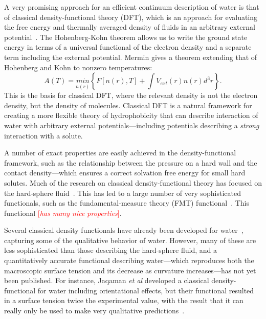 \documentclass[letterpaper,twocolumn,amsmath,amssymb,prb]{revtex4-1}
\newcommand{\needsworknow}[1]{\textcolor{red}{[\emph{#1}]}}
\begin{document}
A very promising approach for an efficient continuum description of water
is that of classical density-functional theory (DFT), which is an approach
for evaluating the free energy and thermally averaged density of fluids in
an arbitrary external potential~\cite{ebner1976density}. The Hohenberg-Kohn
theorem\cite{hohenberg1964inhomogeneous} allows us to write the ground state
energy in terms of a universal functional of the electron density and a separate
term including the external potential. Mermin\cite{mermin1965thermal} gives a
theorem extending that of Hohenberg and Kohn to nonzero temperatures:
\begin{equation}
  A(T) = \underset{n(r)}{min}\left\{ F[n(r),T] + \int V_{ext}(r) n(r)
d^3r\right\}.
\end{equation}
This is the basis for classical DFT, where the relevant density is not the
electron density, but the density of molecules. Classical DFT is a
natural framework for creating a more flexible theory of hydrophobicity
that can describe interaction of water with arbitrary external
potentials---including potentials describing a \emph{strong} interaction
with a solute.
 
A number of exact properties are easily achieved in the density-functional
framework, such as the relationship between the pressure on a hard wall and
the contact density---which ensures a correct solvation free energy for
small hard solutes.  Much of the research on classical density-functional
theory has focused on the hard-sphere fluid~\cite{curtin1985,
rosenfeld1989, rosenfeld1993, rosenfeld1997, tarazona1997, tarazona2000}.
This has led to a large number of very sophisticated functionals, such as
the fundamental-measure theory (FMT) functional~\cite{rosenfeld1989,
rosenfeld1993, rosenfeld1997, tarazona1997, tarazona2000}.  This functional
\needsworknow{has many nice properties}.

Several classical density functionals have already been developed for
water~\cite{ding1987, Yang1992, Jaqaman2004}, capturing some of the
qualitative behavior of water.  However, many of these are less
sophisticated than those describing the hard-sphere fluid, and a
quantitatively accurate functional describing water---which reproduces both
the macroscopic surface tension and its decrease as curvature
increases---has not yet been published.  For instance, Jaqaman \emph{et al}
developed a classical density-functional for water including orientational
effects, but their functional resulted in a surface tension twice the
experimental value, with the result that it can really only be used to make
very qualitative predictions~\cite{Jaqaman2004}.
\end{document}
